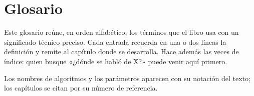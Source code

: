 
\chapter{Glosario}\label{ch:glosario}

\begin{roadmap}
Este glosario reúne, en orden alfabético, los términos que el libro
usa con un significado técnico preciso. Cada entrada recuerda en una
o dos líneas la definición y remite al capítulo donde se desarrolla.
Hace además las veces de índice: quien busque «¿dónde se habló de
X?» puede venir aquí primero.
\end{roadmap}

\medskip
\noindent Los nombres de algoritmos y los parámetros aparecen con su
notación del texto; los capítulos se citan por su número de
referencia.

